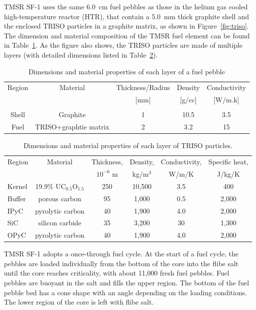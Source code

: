 \documentclass{elsarticle}
\begin{document}
TMSR SF-1 uses the same 6.0~cm fuel pebbles as those in the helium gas cooled high-temperature reactor (HTR), that contain a 5.0~mm thick graphite shell and the enclosed TRISO particles in a graphite matrix, as shown in Figure~\ref{fig:triso}. The dimension and material composition of the TMSR fuel element can be found in Table~\ref{tab:tmsr_pb}. As the figure also shows, the TRISO particles are made of multiple layers (with detailed dimensions listed in Table~\ref{tab:tmsr_triso}).

\begin{table}
  \begin{tabular}[h]{ccccc}
    Region&Material&Thickness/Radius&Density&Conductivity\\
    &&[mm]&[g/cc]&[W/m.k] \\
    \hline\\
    Shell&Graphite&1&10.5&3.5\\
    Fuel&TRISO+graphtie matrix&2&3.2&15\\
  \end{tabular}
  \caption{Dimensions and material properties of each layer of a fuel pebble}
  \label{tab:tmsr_pb}
\end{table}

\begin{table}
  \caption{Dimensions and material properties of each layer of TRISO particles.}
  \begin{tabular}[h]{lccccc}
    \hline
    Region&Material&Thickness,&Density,&Conductivity,&Specific heat,\\
    &&$10^{-6}$ m&kg/m$^3$&W/m/K&J/kg/K\\
    \hline
    Kernel&19.9\% UC$_{0.5}$O$_{1.5}$&250&10,500&3.5&400\\
    Buffer&porous carbon&95&1,000&0.5&2,000\\
    IPyC&pyrolytic carbon&40&1,900&4.0&2,000\\
    SiC&silicon carbide&35&3,200&30&1,300\\
    OPyC&pyrolytic carbon&40&1,900&4.0&2,000\\
    \hline
  \end{tabular}
  \label{tab:tmsr_triso}
\end{table}


TMSR SF-1 adopts a once-through fuel cycle. At the start of a fuel cycle, the pebbles are loaded individually from the bottom of the core into the flibe salt until the core reaches criticality, with about 11,000 fresh fuel pebbles. Fuel pebbles are buoyant in the salt and fills the upper region. The bottom of the fuel pebble bed has a cone shape with an angle depending on the loading conditions. The lower region of the core is left with flibe salt.
\end{document}
